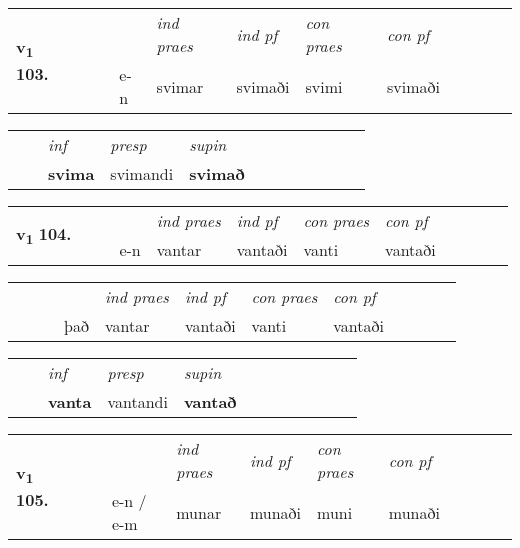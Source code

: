 \begin{tabular}{llllllllllll}\toprule
\multirow{4}{*}{{{\textbf{v{\textsubscript{1}}} \Large{\textbf{103.}}}}}  & &  & &  \textit{ind praes} & \textit{ind pf} & \textit{con praes} & \textit{con pf} \\*
&  & & e-n & svimar & svimaði & svimi & svimaði \\*
\cmidrule{5-9}
\end{tabular}


\begin{tabular}{llllllllllll}
 & & \textit{inf}     & \textit{presp} & \textit{supin}       \\*
  & & \textbf{svima}      & svimandi &  \textbf{svimað}   \\*
\cmidrule{1-12}
\end{tabular}





\begin{tabular}{llllllllllll}\toprule
\multirow{4}{*}{{{\textbf{v{\textsubscript{1}}} \Large{\textbf{104.}}}}}  & &  & &  \textit{ind praes} & \textit{ind pf} & \textit{con praes} & \textit{con pf} \\*
&  & & e-n & vantar & vantaði & vanti & vantaði \\*
\cmidrule{5-9}
\end{tabular}


\begin{tabular}{llllllllllll}
 & &  & &  \textit{ind praes} & \textit{ind pf} & \textit{con praes} & \textit{con pf} \\*
&  & & það & vantar & vantaði & vanti & vantaði \\*
\cmidrule{5-9}
\end{tabular}


\begin{tabular}{llllllllllll}
 & & \textit{inf}     & \textit{presp} & \textit{supin}       \\*
  & & \textbf{vanta}      & vantandi &  \textbf{vantað}   \\*
\cmidrule{1-12}
\end{tabular}





\begin{tabular}{llllllllllll}\toprule
\multirow{4}{*}{{{\textbf{v{\textsubscript{1}}} \Large{\textbf{105.}}}}}  & &  & &  \textit{ind praes} & \textit{ind pf} & \textit{con praes} & \textit{con pf} \\*
&  & & e-n / e-m & munar & munaði & muni & munaði \\*
\cmidrule{5-9}
\end{tabular}


